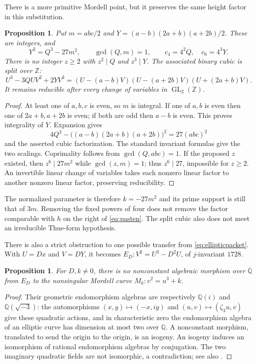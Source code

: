 \documentclass[11pt]{amsart}
\newtheorem{proposition}[theorem]{Proposition}
\theoremstyle{definition}
\theoremstyle{remark}
\newcommand{\Q}{\mathbb Q}
\newcommand{\Z}{\mathbb Z}
\newcommand{\GL}{\operatorname{GL}}
\begin{document}
There is a more primitive Mordell point, but it preserves the same
height factor in this substitution.
\begin{proposition}\label{prop:primitive-frey-mordell}
Put $m=abc/2$ and
$Y=(a-b)(2a+b)(a+2b)/2$. These are integers, and
\[
 Y^2=Q^3-27m^2,\qquad \gcd(Q,m)=1,\qquad
 c_4=4^2Q,\quad c_6=4^3Y.
\]
There is no integer $z\ge2$ with $z^2\mid Q$ and $z^3\mid Y$.
The associated binary cubic is split over $\Z$:
\[
 U^3-3QUV^2+2YV^3
 =(U-(a-b)V)(U-(a+2b)V)(U+(2a+b)V).
\]
It remains reducible after every change of variables in $\GL_2(\Z)$.
\end{proposition}
\begin{proof}
At least one of $a,b,c$ is even, so $m$ is integral. If one of $a,b$
is even then one of $2a+b,a+2b$ is even; if both are odd then $a-b$
is even. This proves integrality of $Y$.
Expansion gives
\[
 4Q^3-\bigl((a-b)(2a+b)(a+2b)\bigr)^2=27(abc)^2
\]
and the asserted cubic factorization. The standard invariant formulas
give the two scalings. Coprimality follows from $\gcd(Q,abc)=1$.
If the proposed $z$ existed, then $z^6\mid27m^2$ while $\gcd(z,m)=1$;
thus $z^6\mid27$, impossible for $z\ge2$. An invertible linear change
of variables takes each nonzero linear factor to another nonzero linear
factor, preserving reducibility.
\end{proof}

The normalized parameter is therefore $k=-27m^2$ and its prime support
is still that of $3m$. Removing the fixed powers of four does not remove
the factor comparable with $h$ on the right of \eqref{eq:pasten}.
The split cubic also does not meet an irreducible Thue-form hypothesis.

There is also a strict obstruction to one possible transfer from
\eqref{eq:ellipticpacket}. With $U=Dx$ and $V=DY$, it becomes
$E_D:V^2=U^3-D^2U$, of $j$-invariant $1728$.

\begin{proposition}\label{prop:cm}
For $D,k\ne0$, there is no nonconstant algebraic morphism over
$\overline{\Q}$ from $E_D$ to the nonsingular Mordell curve
$M_k:v^2=u^3+k$.
\end{proposition}
\begin{proof}
Their geometric endomorphism algebras are respectively $\Q(i)$ and
$\Q(\sqrt{-3})$: the automorphisms
$(x,y)\mapsto(-x,iy)$ and $(u,v)\mapsto(\zeta_3u,v)$ give these
quadratic actions, and in characteristic zero the endomorphism algebra
of an elliptic curve has dimension at most two over $\Q$.
A nonconstant morphism, translated to send the origin to the origin,
is an isogeny. An isogeny induces an isomorphism of rational endomorphism
algebras by conjugation. The two imaginary quadratic fields are not
isomorphic, a contradiction; see also \cite[Chapters III and VI]{Silverman}.
\end{proof}
\end{document}
